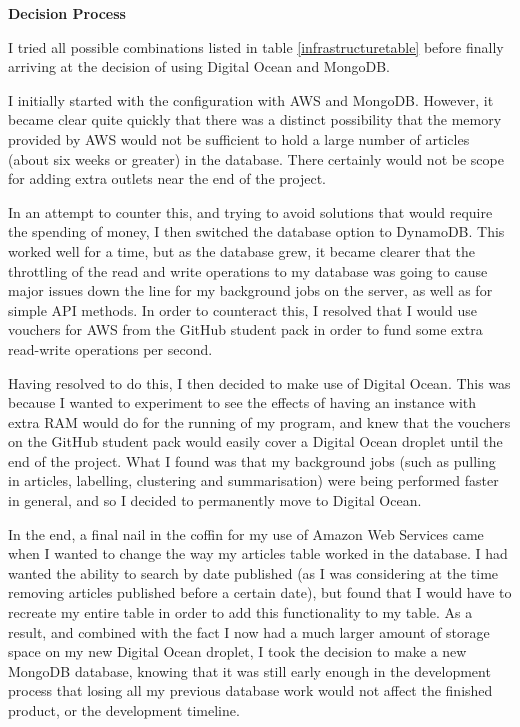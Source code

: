 \documentclass[12pt]{article}
\begin{document}
\textbf{Decision Process}

I tried all possible combinations listed in table \ref{infrastructuretable} before finally arriving at the decision of using Digital Ocean and MongoDB.

I initially started with the configuration with AWS and MongoDB. However, it became clear quite quickly that there was a distinct possibility that the memory provided by AWS would not be sufficient to hold a large number of articles (about six weeks or greater) in the database. There certainly would not be scope for adding extra outlets near the end of the project.

In an attempt to counter this, and trying to avoid solutions that would require the spending of money, I then switched the database option to DynamoDB. This worked well for a time, but as the database grew, it became clearer that the throttling of the read and write operations to my database was going to cause major issues down the line for my background jobs on the server, as well as for simple API methods. In order to counteract this, I resolved that I would use vouchers for AWS from the GitHub student pack in order to fund some extra read-write operations per second.

Having resolved to do this, I then decided to make use of Digital Ocean. This was because I wanted to experiment to see the effects of having an instance with extra RAM would do for the running of my program, and knew that the vouchers on the GitHub student pack would easily cover a Digital Ocean droplet until the end of the project. What I found was that my background jobs (such as pulling in articles, labelling, clustering and summarisation) were being performed faster in general, and so I decided to permanently move to Digital Ocean.

In the end, a final nail in the coffin for my use of Amazon Web Services came when I wanted to change the way my articles table worked in the database. I had wanted the ability to search by date published (as I was considering at the time removing articles published before a certain date), but found that I would have to recreate my entire table in order to add this functionality to my table. As a result, and combined with the fact I now had a much larger amount of storage space on my new Digital Ocean droplet, I took the decision to make a new MongoDB database, knowing that it was still early enough in the development process that losing all my previous database work would not affect the finished product, or the development timeline.
\end{document}
